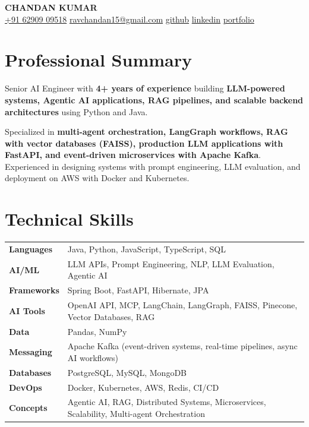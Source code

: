 \documentclass[10pt, letterpaper]{article}
\begin{document}
\begin{center}
{\LARGE\bfseries\color{primary} CHANDAN KUMAR}\\[4pt]

\small\color{subtle}
\href{tel:+916290909518}{+91 62909 09518} \quad
\href{mailto:ravchandan15@gmail.com}{ravchandan15@gmail.com} \quad
\href{https://github.com/RavSinghChandan}{github} \quad
\href{https://linkedin.com}{linkedin} \quad
\href{https://chandan-kumar-ai-engineer.vercel.app/}{portfolio}
\end{center}

\vspace{-2pt}

\section{Professional Summary}

\noindent Senior AI Engineer with \textbf{4+ years of experience} building \textbf{LLM-powered systems, Agentic AI applications, RAG pipelines, and scalable backend architectures} using Python and Java.

\vspace{3pt}

\noindent Specialized in \textbf{multi-agent orchestration, LangGraph workflows, RAG with vector databases (FAISS), production LLM applications with FastAPI, and event-driven microservices with Apache Kafka}. Experienced in designing systems with prompt engineering, LLM evaluation, and deployment on AWS with Docker and Kubernetes.

\section{Technical Skills}

\begin{tabularx}{\textwidth}{@{} l X @{}}
\textbf{Languages} & Java, Python, JavaScript, TypeScript, SQL \\[2pt]
\textbf{AI/ML} & LLM APIs, Prompt Engineering, NLP, LLM Evaluation, Agentic AI \\[2pt]
\textbf{Frameworks} & Spring Boot, FastAPI, Hibernate, JPA \\[2pt]
\textbf{AI Tools} & OpenAI API, MCP, LangChain, LangGraph, FAISS, Pinecone, Vector Databases, RAG \\[2pt]
\textbf{Data} & Pandas, NumPy \\[2pt]
\textbf{Messaging} & Apache Kafka (event-driven systems, real-time pipelines, async AI workflows) \\[2pt]
\textbf{Databases} & PostgreSQL, MySQL, MongoDB \\[2pt]
\textbf{DevOps} & Docker, Kubernetes, AWS, Redis, CI/CD \\[2pt]
\textbf{Concepts} & Agentic AI, RAG, Distributed Systems, Microservices, Scalability, Multi-agent Orchestration \\
\end{tabularx}
\end{document}
